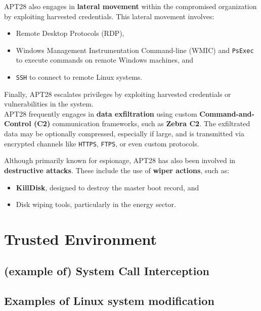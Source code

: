 APT28 also engages in \textbf{lateral movement} within the compromised organization by exploiting harvested credentials. This lateral movement involves:
\begin{itemize}
    \item Remote Desktop Protocols (RDP),
    \item Windows Management Instrumentation Command-line (WMIC) and \texttt{PsExec} to execute commands on remote Windows machines, and
    \item \texttt{SSH} to connect to remote Linux systems.
\end{itemize}

Finally, APT28 escalates privileges by exploiting harvested credentials or vulnerabilities in the system. \\

APT28 frequently engages in \textbf{data exfiltration} using custom \textbf{Command-and-Control (C2)} communication frameworks, such as \textbf{Zebra C2}. The exfiltrated data may be optionally compressed, especially if large, and is transmitted via encrypted channels like \texttt{HTTPS}, \texttt{FTPS}, or even custom protocols.

Although primarily known for espionage, APT28 has also been involved in \textbf{destructive attacks}. These include the use of \textbf{wiper actions}, such as:
\begin{itemize}
    \item \textbf{KillDisk}, designed to destroy the master boot record, and
    \item Disk wiping tools, particularly in the energy sector.
\end{itemize}


\section{Trusted Environment}

\subsection{(example of) System Call Interception}

\subsection{Examples of Linux system modification}
